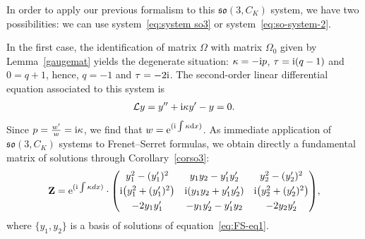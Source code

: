 \documentclass[10pt,a4paper]{amsart}
\numberwithin{equation}{section}
\begin{document}
In order to apply our previous formalism to this $\mathfrak{so}(3, C_K)$ system, we have two possibilities: we can use system~\eqref{eq:system so3} or system~\eqref{eq:so-system-2}.

In the first case, the identification of matrix $\Omega$ with matrix $\Omega_0$ given by Lemma~\ref{gaugemat} yields the degenerate situation: $\kappa = -{\rm i}p $, $\tau = {\rm i} (q-1)$ and $0 = q+1$, hence, $q= -1$ and $\tau= -2{\rm i}$. The second-order linear differential equation associated to this system is
\begin{gather}\label{eq:FS-eq1}
 \mathcal{L} y = y'' +{\rm i}\kappa y' -y =0.
\end{gather}
Since $p= \frac{w'}{w} ={\rm i} \kappa$, we find that $w = {\rm e}^{({\rm i} \int \kappa {\rm d}x)}$. As immediate application of $\mathfrak{so}(3, C_K)$ systems to Frenet--Serret formulas, we obtain directly a fundamental matrix of solutions through Corollary~\ref{corso3}:
\begin{gather*}
 \mathbf{Z} = {\rm e}^{({\rm i} \int \kappa dx)} \cdot
\begin{pmatrix}
y_1^2 - (y_1')^2 & y_1 y_2 - y_1' y_2' & y_2^2 -(y_2')^{2} \\[3pt]
{\rm i} \big(y_1^2 + (y_1')^{2}\big) & {\rm i} (y_1 y_2 + y_1' y_2') & {\rm i} \big(y_2^2 + (y_2')^{2}\big) \\[3pt]
-2 y_1 y_1' & - y_1 y_2' - y_1' y_2 & -2 y_2 y_2' \end{pmatrix}\!,
\end{gather*}
where $\{ y_1, y_2\}$ is a basis of solutions of equation~\eqref{eq:FS-eq1}.
\end{document}
